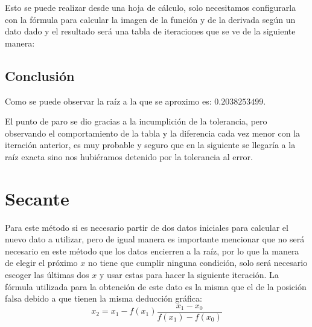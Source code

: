 \documentclass{article}
\begin{document}
Esto se puede realizar desde una hoja de cálculo, solo necesitamos configurarla con la fórmula para calcular la imagen
de la función y de la derivada según un dato dado y el resultado será una tabla de iteraciones que se ve de la siguiente
manera:


\begin{table}[h] 
   \begin{adjustwidth}{-1.5cm}{0cm}
   \end{adjustwidth}
\end{table}


\subsection*{Conclusión}
Como se puede observar la raíz a la que se aproximo es: $0.2038253499$.


El punto de paro se dio gracias a la incumplición de la tolerancia, pero observando el comportamiento de la tabla y la
diferencia cada vez menor con la iteración anterior, es muy probable y seguro que en la siguiente se llegaría a la raíz
exacta sino nos hubiéramos detenido por la tolerancia al error.


\section{Secante}
Para este método si es necesario partir de dos datos iniciales para calcular el nuevo dato a utilizar, pero de igual manera
es importante mencionar que no será necesario en este método que los datos encierren a la raíz, por lo que la manera de
elegir el próximo $x$ no tiene que cumplir ninguna condición, solo será necesario escoger las últimas dos $x$ y usar estas
para hacer la siguiente iteración. La fórmula utilizada para la obtención de este dato es la misma que el de la posición
falsa debido a que tienen la misma deducción gráfica: $$x_2=x_1-f(x_1)\frac{x_1-x_0}{f(x_1)-f(x_0)}$$
\end{document}

